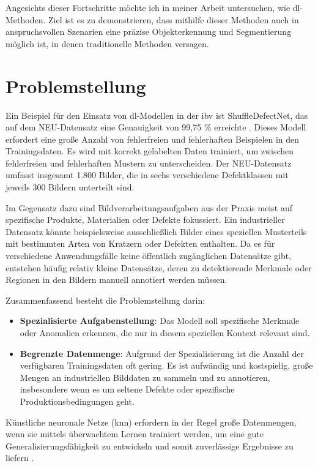Angesichts dieser Fortschritte möchte ich in meiner Arbeit untersuchen, wie \gls{dl}-Methoden. Ziel ist es zu demonstrieren, dass mithilfe dieser Methoden auch in anspruchsvollen Szenarien eine präzise Objekterkennung und Segmentierung möglich ist, in denen traditionelle Methoden versagen.

\section{Problemstellung}\label{problemstellung}

Ein Beispiel für den Einsatz von \gls{dl}-Modellen in der \gls{ibv} ist ShuffleDefectNet, das auf dem NEU-Datensatz eine Genauigkeit von 99,75 \% erreichte \cite{saberironaghi_defect_2023}. Dieses Modell erfordert eine große Anzahl von fehlerfreien und fehlerhaften Beispielen in den Trainingsdaten. Es wird mit korrekt gelabelten Daten trainiert, um zwischen fehlerfreien und fehlerhaften Mustern zu unterscheiden. Der NEU-Datensatz umfasst insgesamt 1.800 Bilder, die in sechs verschiedene Defektklassen mit jeweils 300 Bildern unterteilt sind.

Im Gegensatz dazu sind Bildverarbeitungsaufgaben aus der Praxis meist auf spezifische Produkte, Materialien oder Defekte fokussiert. Ein industrieller Datensatz könnte beispielsweise ausschließlich Bilder eines speziellen Musterteils mit bestimmten Arten von Kratzern oder Defekten enthalten. Da es für verschiedene Anwendungsfälle keine öffentlich zugänglichen Datensätze gibt, entstehen häufig relativ kleine Datensätze, deren zu detektierende Merkmale oder Regionen in den Bildern manuell annotiert werden müssen.

Zusammenfassend besteht die Problemstellung darin:

\begin{itemize} 
\item \textbf{Spezialisierte Aufgabenstellung}: Das Modell soll spezifische Merkmale oder Anomalien erkennen, die nur in diesem speziellen Kontext relevant sind. 
\item \textbf{Begrenzte Datenmenge}: Aufgrund der Spezialisierung ist die Anzahl der verfügbaren Trainingsdaten oft gering. Es ist aufwändig und kostspielig, große Mengen an industriellen Bilddaten zu sammeln und zu annotieren, insbesondere wenn es um seltene Defekte oder spezifische Produktionsbedingungen geht. 
\end{itemize}

Künstliche neuronale Netze (\gls{knn}) erfordern in der Regel große Datenmengen, wenn sie mittels überwachtem Lernen trainiert werden, um eine gute Generalisierungsfähigkeit zu entwickeln und somit zuverlässige Ergebnisse zu liefern \cite{lecun_deep_2015}.


